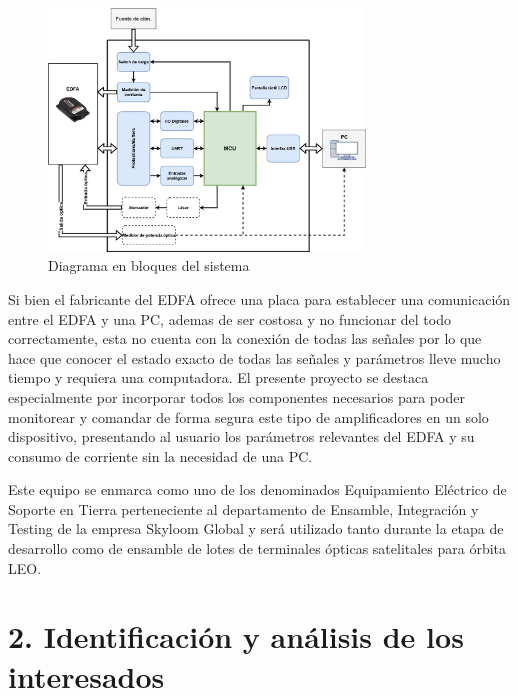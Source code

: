 \documentclass[
11pt, %
]{charter}
\begin{document}
\begin{figure}[H]
\centering 
\includegraphics[width=0.75\textwidth]{./Figuras/diagTester.jpg}
\caption{Diagrama en bloques del sistema}
\label{fig:diagTester}
\end{figure}


Si bien el fabricante del EDFA ofrece una placa para establecer una comunicación entre el EDFA y una PC, ademas de ser costosa y no funcionar del todo correctamente, esta no cuenta con la conexión de todas las señales por lo que hace que conocer el estado exacto de todas las señales y parámetros lleve mucho tiempo y requiera una computadora. El presente proyecto se destaca especialmente por incorporar todos los componentes necesarios para poder monitorear y comandar de forma segura este tipo de amplificadores en un solo dispositivo, presentando al usuario los parámetros relevantes del EDFA y su consumo de corriente sin la necesidad de una PC.

Este equipo se enmarca como uno de los denominados Equipamiento Eléctrico de Soporte en Tierra perteneciente al departamento de Ensamble, Integración y Testing de la empresa Skyloom Global y será utilizado tanto durante la etapa de desarrollo como de ensamble de lotes de terminales ópticas satelitales para órbita LEO.


\section{2. Identificación y análisis de los interesados}
\label{sec:interesados}
\end{document}
